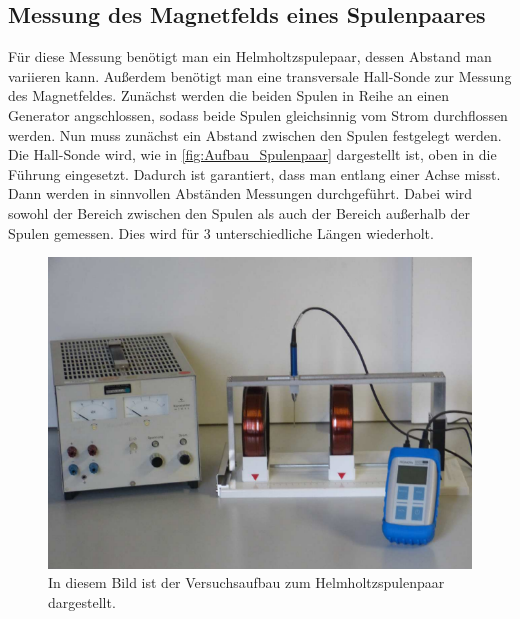 \subsection{Messung des Magnetfelds eines Spulenpaares}
\label{subsec:D_Spulenpaar}
Für diese Messung benötigt man ein Helmholtzspulepaar, dessen Abstand man variieren kann. Außerdem benötigt man eine transversale Hall-Sonde zur Messung des Magnetfeldes. Zunächst
werden die beiden Spulen in Reihe an einen Generator angschlossen, sodass beide Spulen gleichsinnig vom Strom durchflossen werden. Nun muss zunächst ein Abstand zwischen den Spulen 
festgelegt werden. Die Hall-Sonde wird, wie in \autoref{fig:Aufbau_Spulenpaar} dargestellt ist, oben in die Führung eingesetzt. Dadurch ist garantiert, dass man entlang einer Achse misst.
Dann werden in sinnvollen Abständen Messungen durchgeführt. Dabei wird sowohl der Bereich zwischen den Spulen als auch der Bereich außerhalb der Spulen gemessen. Dies wird für 3 unterschiedliche 
Längen wiederholt.
\begin{figure}
    \centering
    \caption{In diesem Bild ist der Versuchsaufbau zum Helmholtzspulenpaar dargestellt.\cite{v308}}
    \label{fig:Aufbau_Spulenpaar}
    \includegraphics[width=\textwidth]{content/HelmHoltzAufbau.PNG}
\end{figure}
